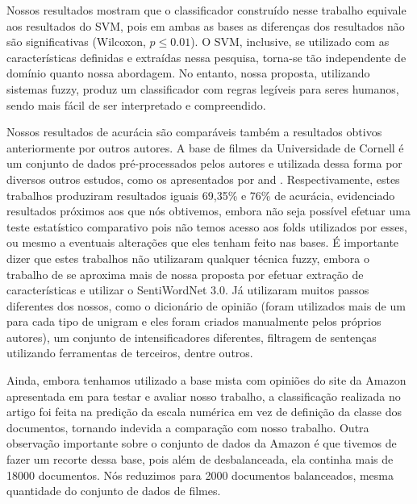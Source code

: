 \documentclass[template.tex]{subfiles}
\begin{document}
%
%
%

Nossos resultados mostram que o classificador construído nesse trabalho equivale aos resultados do SVM, pois em ambas as bases as diferenças dos resultados não são significativas (Wilcoxon, $p\leq0.01$). O SVM, inclusive, se utilizado com as características definidas e extraídas nessa pesquisa, torna-se tão independente de domínio quanto nossa abordagem. No entanto, nossa proposta, utilizando sistemas fuzzy, produz um classificador com regras legíveis para seres humanos, sendo mais fácil de ser interpretado e compreendido. 


Nossos resultados de acurácia são comparáveis também a resultados obtivos anteriormente por outros autores. A base de filmes da Universidade de Cornell \cite{pang2004sentimental} é um conjunto de dados pré-processados pelos autores e utilizada dessa forma por diversos outros estudos, como os apresentados por  and . Respectivamente, estes trabalhos produziram resultados iguais 69,35\% e 76\% de acurácia, evidenciado resultados próximos aos que nós obtivemos, embora não seja possível efetuar uma teste estatístico comparativo pois não temos acesso aos folds utilizados por esses, ou mesmo a eventuais alterações que eles tenham feito nas bases. É importante dizer que estes trabalhos não utilizaram qualquer técnica fuzzy, embora o trabalho de  se aproxima mais de nossa proposta por efetuar extração de características e utilizar o SentiWordNet 3.0. Já  utilizaram muitos passos diferentes dos nossos, como o dicionário de opinião (foram utilizados mais de um para cada tipo de unigram e eles foram criados manualmente pelos próprios autores), um conjunto de intensificadores diferentes, filtragem de sentenças utilizando ferramentas de terceiros, dentre outros.  

Ainda, embora tenhamos utilizado a base mista com opiniões do site da Amazon apresentada em  para testar e avaliar nosso trabalho, a classificação realizada no artigo foi feita na predição da escala numérica em vez de definição da classe dos documentos, tornando indevida a comparação com nosso trabalho. Outra observação importante sobre o conjunto de dados da Amazon é que tivemos de fazer um recorte dessa base, pois além de desbalanceada, ela continha mais de 18000 documentos. Nós reduzimos para 2000 documentos balanceados, mesma quantidade do conjunto de dados de filmes. 
\end{document}
